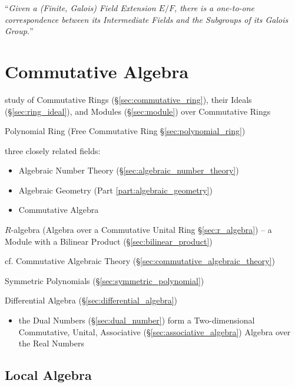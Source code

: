 ``\emph{Given a (Finite, Galois) Field Extension $E/F$, there is a one-to-one
correspondence between its Intermediate Fields and the Subgroups of its Galois
Group.}''



\section{Commutative Algebra}\label{sec:commutative_algebra}

study of Commutative Rings (\S\ref{sec:commutative_ring}), their Ideals
(\S\ref{sec:ring_ideal}), and Modules (\S\ref{sec:module}) over Commutative
Rings

Polynomial Ring (Free Commutative Ring \S\ref{sec:polynomial_ring})

three closely related fields:
\begin{itemize}
  \item Algebraic Number Theory (\S\ref{sec:algebraic_number_theory})
  \item Algebraic Geometry (Part \ref{part:algebraic_geometry})
  \item Commutative Algebra
\end{itemize}

\fist $R$-algebra (Algebra over a Commutative Unital Ring \S\ref{sec:r_algebra})
-- a Module with a Bilinear Product (\S\ref{sec:bilinear_product})

\fist cf. Commutative Algebraic Theory
(\S\ref{sec:commutative_algebraic_theory})

\fist Symmetric Polynomials (\S\ref{sec:symmetric_polynomial})

\fist Differential Algebra (\S\ref{sec:differential_algebra})

\begin{itemize}
  \item the Dual Numbers (\S\ref{sec:dual_number}) form a Two-dimensional
    Commutative, Unital, Associative (\S\ref{sec:associative_algebra}) Algebra
    over the Real Numbers
\end{itemize}



\subsection{Local Algebra}\label{sec:local_algebra}

